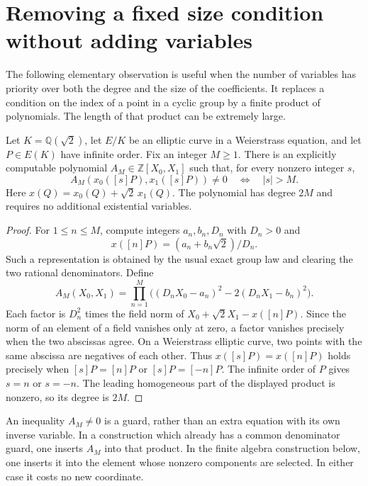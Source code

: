 \section{Removing a fixed size condition without adding variables}
\label{sec:finite-anchor}

The following elementary observation is useful when the number of variables
has priority over both the degree and the size of the coefficients.  It
replaces a condition on the index of a point in a cyclic group by a finite
product of polynomials.  The length of that product can be extremely large.

\begin{proposition}\label{prop:finite-anchor}
Let $K=\mathbb Q(\sqrt2)$, let $E/K$ be an elliptic curve in a Weierstrass
equation, and let $P\in E(K)$ have infinite order.  Fix an integer $M\geq1$.
There is an explicitly computable polynomial
$A_M\in\mathbb Z[X_0,X_1]$ such that, for every nonzero integer $s$,
\[
 A_M(x_0([s]P),x_1([s]P))\ne0
 \quad\Longleftrightarrow\quad |s|>M.
\]
Here $x(Q)=x_0(Q)+\sqrt2\,x_1(Q)$.  The polynomial has degree $2M$ and
requires no additional existential variables.
\end{proposition}
\begin{proof}
For $1\leq n\leq M$, compute integers $a_n,b_n,D_n$ with $D_n>0$ and
\[
 x([n]P)=(a_n+b_n\sqrt2)/D_n.
\]
Such a representation is obtained by the usual exact group law and clearing
the two rational denominators.  Define
\[
 A_M(X_0,X_1)=\prod_{n=1}^M
 \bigl((D_nX_0-a_n)^2-2(D_nX_1-b_n)^2\bigr).
\]
Each factor is $D_n^2$ times the field norm of
$X_0+\sqrt2 X_1-x([n]P)$.  Since the norm of an element of a field vanishes
only at zero, a factor vanishes precisely when the two abscissas agree.
On a Weierstrass elliptic curve, two points with the same abscissa are
negatives of each other.  Thus $x([s]P)=x([n]P)$ holds precisely when
$[s]P=[n]P$ or $[s]P=[-n]P$.  The infinite order of $P$ gives $s=n$ or
$s=-n$.  The leading homogeneous part of the displayed product is nonzero,
so its degree is $2M$.
\end{proof}

An inequality $A_M\ne0$ is a guard, rather than an extra equation with its
own inverse variable.  In a construction which already has a common
denominator guard, one inserts $A_M$ into that product.  In the finite
algebra construction below, one inserts it into the element whose nonzero
components are selected.  In either case it costs no new coordinate.

